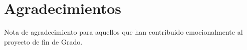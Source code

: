 
\chapter*{Agradecimientos}

Nota de agradecimiento para aquellos que han contribuido emocionalmente al proyecto de fin de Grado.

